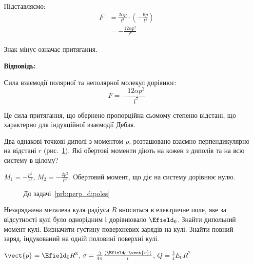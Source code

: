 \begin{problem}
\begin{solution}
Підставляємо:
\begin{align}
F &= \frac{2\alpha p}{l^3} \cdot \left(-\frac{6p}{l^4}\right) \\
&= -\frac{12\alpha p^2}{l^7}
\end{align}

Знак мінус означає притягання.

\textbf{Відповідь:}

Сила взаємодії полярної та неполярної молекул дорівнює:
\begin{equation}
F = -\frac{12\alpha p^2}{l^7}
\end{equation}

Це сила притягання, що обернено пропорційна сьомому степеню відстані, що характерно для індукційної взаємодії Дебая.
\end{solution}
\end{problem}


\begin{problem}\label{prb:perp_dipoles}
Два однакові точкові диполі з моментом $p$, розташовано взаємно перпендикулярно на відстані $r$ (рис.~\ref{perp_dipoles}). Які обертові моменти діють на  кожен з диполів та на всю систему в цілому?
\begin{solution}
	$M_1 = -\frac{p^2}{r^3}$, $M_2 = -\frac{2p^2}{r^3}$. Обертовий момент, що діє на систему дорівнює нулю.
\end{solution}
\end{problem}
\begin{figure}[h!]\centering
	\caption{До задачі~\ref{prb:perp_dipoles}}
	\label{perp_dipoles}
\end{figure}

\begin{problem}%
Незаряджена металева куля радіуса $R$ вноситься в електричне поле, яке за відсутності кулі було однорідним і дорівнювало $\Efield_0$. Знайти дипольний момент кулі. Визначити густину поверхневих зарядів на кулі. Знайти повний заряд, індукований на одній половині поверхні кулі.
\begin{solution}
	$\vect{p} = \Efield_0 R^3$,
	$\sigma = \frac{3}{4\pi} \frac{\left( \Efield_0\cdot\vect{r}\right) }{r}$,
	$Q = \frac34 E_0 R^2$
\end{solution}
\end{problem}

